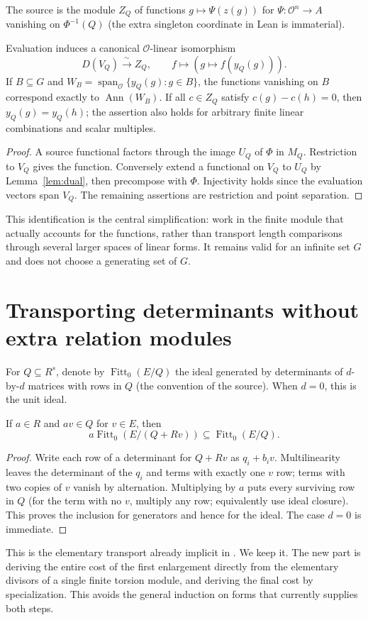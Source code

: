 \documentclass[11pt]{article}
\newcommand{\OO}{\mathcal O}\newcommand{\FF}{\operatorname{Fitt}_0}\newcommand{\len}{\operatorname{length}_{\OO}}\newcommand{\val}{\operatorname{v}}\newcommand{\Hom}{\operatorname{Hom}}\newcommand{\Span}{\operatorname{span}}\newcommand{\code}[1]{\texttt{\detokenize{#1}}}
\newcommand{\src}[2]{\href{https://github.com/VladimirReshetnikov/ProveIt/blob/9050b04000647d588d0c78d945180abcd3b0bcf7/Analysis/GeneralizedRiemannHypothesis/Lean/grh/src/#1}{#2}}
\begin{document}
The source \src{Lib/General/Algebra/FittingIdealsAndLengths.lean\#L591}{\code{formsMod}} is the module $Z_Q$ of functions $g\mapsto\Psi(z(g))$ for $\Psi:\OO^n\to A$ vanishing on $\Phi^{-1}(Q)$ (the extra singleton coordinate in Lean is immaterial).
\begin{lemma}\label{lem:eval}
Evaluation induces a canonical $\OO$-linear isomorphism
\[
 D(V_Q)\xrightarrow{\ \sim\ } Z_Q,\qquad f\longmapsto(g\mapsto f(y_Q(g))).
\]
If $B\subseteq G$ and $W_B=\Span_{\OO}\{y_Q(g):g\in B\}$, the functions vanishing on $B$ correspond exactly to $\operatorname{Ann}(W_B)$. If all $c\in Z_Q$ satisfy $c(g)-c(h)=0$, then $y_Q(g)=y_Q(h)$; the assertion also holds for arbitrary finite linear combinations and scalar multiples.
\end{lemma}
\begin{proof}
A source functional factors through the image $U_Q$ of $\Phi$ in $M_Q$. Restriction to $V_Q$ gives the function. Conversely extend a functional on $V_Q$ to $U_Q$ by Lemma~\ref{lem:dual}, then precompose with $\Phi$. Injectivity holds since the evaluation vectors span $V_Q$. The remaining assertions are restriction and point separation.
\end{proof}

This identification is the central simplification: work in the finite module that actually accounts for the functions, rather than transport length comparisons through several larger spaces of linear forms. It remains valid for an infinite set $G$ and does not choose a generating set of $G$.
\section{Transporting determinants without extra relation modules}
For $Q\subseteq R^s$, denote by $\FF(E/Q)$ the ideal generated by determinants of $d$-by-$d$ matrices with rows in $Q$ (the convention of the source). When $d=0$, this is the unit ideal.
\begin{lemma}\label{lem:transport}
If $a\in R$ and $av\in Q$ for $v\in E$, then
\[
 a\FF(E/(Q+Rv))\subseteq \FF(E/Q).
\]
\end{lemma}
\begin{proof}
Write each row of a determinant for $Q+Rv$ as $q_i+b_iv$. Multilinearity leaves the determinant of the $q_i$ and terms with exactly one $v$ row; terms with two copies of $v$ vanish by alternation. Multiplying by $a$ puts every surviving row in $Q$ (for the term with no $v$, multiply any row; equivalently use ideal closure). This proves the inclusion for generators and hence for the ideal. The case $d=0$ is immediate.
\end{proof}
This is the elementary transport already implicit in \src{Lib/General/Algebra/FittingIdealsAndLengths.lean\#L494}{\code{mul_det_mem_fittingIdeal}}. We keep it. The new part is deriving the entire cost of the first enlargement directly from the elementary divisors of a single finite torsion module, and deriving the final cost by specialization. This avoids the general induction on forms that currently supplies both steps.
\end{document}
